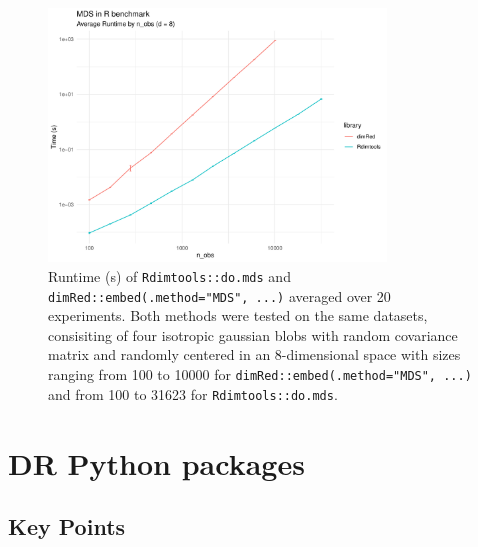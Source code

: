 \documentclass[a4paper,12pt]{article}
\begin{document}
\begin{figure}[ht]
    \centering
    \includegraphics[width=0.8\textwidth]{figures/MDS_dimRed_vs_Rdimtools.pdf}
    \caption{Runtime (s) of \texttt{Rdimtools::do.mds} and \texttt{dimRed::embed(.method="MDS", ...)} averaged over 20 experiments. Both methods were tested on the same datasets, consisiting of four isotropic gaussian blobs with random covariance matrix and randomly centered in an 8-dimensional space with sizes ranging from 100 to 10000 for \texttt{dimRed::embed(.method="MDS", ...)} and from 100 to 31623 for \texttt{Rdimtools::do.mds}.}
    \label{fig:MDS_dimRed_vs_Rdimtools}
\end{figure}

\pagebreak
\section{DR Python packages}

\subsection{Key Points}
\end{document}
